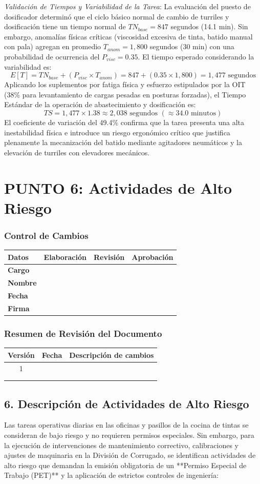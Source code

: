 \documentclass[11pt, letterpaper]{article}
\newcommand{\controlcambios}{
    \subsubsection*{Control de Cambios}
    \begin{table}[H]
        \centering
        \small
        \begin{tabular}{lp{4cm}p{4cm}p{4cm}}
            \toprule
            \textbf{Datos} & \textbf{Elaboración} & \textbf{Revisión} & \textbf{Aprobación} \\
            \midrule
            \textbf{Cargo} & & & \\
            \textbf{Nombre} & & & \\
            \textbf{Fecha} & & & \\
            \textbf{Firma} & & & \\
            \bottomrule
        \end{tabular}
    \end{table}
}
\newcommand{\resumenrevision}[1]{
    \subsubsection*{Resumen de Revisión del Documento}
    \begin{table}[H]
        \centering
        \small
        \begin{tabular}{ccp{8cm}}
            \toprule
            \textbf{Versión} & \textbf{Fecha} & \textbf{Descripción de cambios} \\
            \midrule
            #1 & & \\
            & & \\
            & & \\
            \bottomrule
        \end{tabular}
    \end{table}
}
\begin{document}
\textit{Validación de Tiempos y Variabilidad de la Tarea}: La evaluación del puesto de dosificador determinó que el ciclo básico normal de cambio de turriles y dosificación tiene un tiempo normal de $TN_{base} = 847$ segundos (14.1 min). Sin embargo, anomalías físicas críticas (viscosidad excesiva de tinta, batido manual con pala) agregan en promedio $T_{anom} = 1,800$ segundos (30 min) con una probabilidad de ocurrencia del $P_{visc} = 0.35$.
El tiempo esperado considerando la variabilidad es:
\begin{equation}
    E[T] = TN_{base} + (P_{visc} \times T_{anom}) = 847 + (0.35 \times 1,800) = 1,477 \text{ segundos}
\end{equation}
Aplicando los suplementos por fatiga física y esfuerzo estipulados por la OIT (38\% para levantamiento de cargas pesadas en posturas forzadas), el Tiempo Estándar de la operación de abastecimiento y dosificación es:
\begin{equation}
    TS = 1,477 \times 1.38 \approx 2,038 \text{ segundos } (\approx 34.0 \text{ minutos})
\end{equation}
El coeficiente de variación del 49.4\% confirma que la tarea presenta una alta inestabilidad física e introduce un riesgo ergonómico crítico que justifica plenamente la mecanización del batido mediante agitadores neumáticos y la elevación de turriles con elevadores mecánicos.

\newpage
\section{PUNTO 6: Actividades de Alto Riesgo}
\controlcambios
\resumenrevision{1}
\subsection{6. Descripción de Actividades de Alto Riesgo}
Las tareas operativas diarias en las oficinas y pasillos de la cocina de tintas se consideran de bajo riesgo y no requieren permisos especiales. Sin embargo, para la ejecución de intervenciones de mantenimiento correctivo, calibraciones y ajustes de maquinaria en la División de Corrugado, se identifican actividades de alto riesgo que demandan la emisión obligatoria de un **Permiso Especial de Trabajo (PET)** y la aplicación de estrictos controles de ingeniería:
\end{document}
